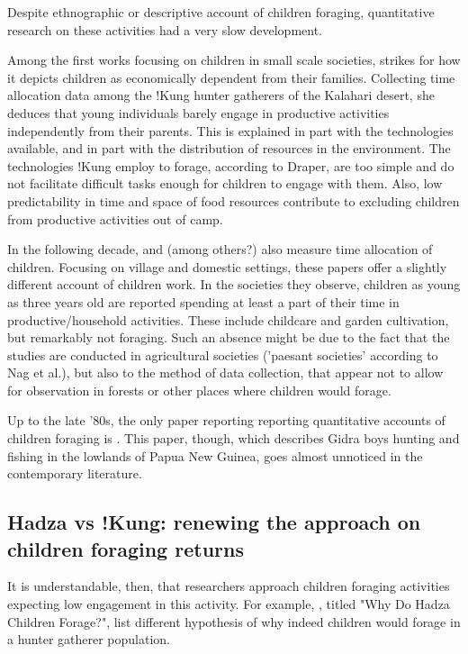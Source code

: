 Despite ethnographic or descriptive account of children foraging, quantitative research on these activities had a very slow development. %

Among the first works focusing on children in small scale societies, \cite{lee_social_1976} strikes for how it depicts children as economically dependent from their families. Collecting time allocation data among the !Kung hunter gatherers of the Kalahari desert, she deduces that young individuals barely engage in productive activities independently from their parents. This is explained in part with the technologies available, and in part with the distribution of resources in the environment. The technologies !Kung employ to forage, according to Draper, are too simple and do not facilitate difficult tasks enough for children to engage with them. Also, low predictability in time and space of food resources contribute to excluding children from productive activities out of camp. 

In the following decade, \cite{nag_anthropological_1978} and \cite{munroe_childrens_1984} (among others?) also measure time allocation of children. Focusing on village and domestic settings, these papers offer a slightly different account of children work. In the societies they observe, children as young as three years old are reported spending at least a part of their time in productive/household activities. These include childcare and garden cultivation, but remarkably not foraging. Such an absence might be due to the fact that the studies are conducted in agricultural societies ('paesant societies' according to Nag et al.), but also to the method of data collection, that appear not to allow for observation in forests or other places where children would forage.

Up to the late '80s, the only paper reporting reporting quantitative accounts of children foraging is \cite{kawabe_development_1983}. This paper, though, which describes Gidra boys hunting and fishing in the lowlands of Papua New Guinea, goes almost unnoticed in the contemporary literature. 

\subsection{Hadza vs !Kung: renewing the approach on children foraging returns}

It is understandable, then, that researchers approach children foraging activities expecting low engagement in this activity. For example, \cite{blurton_jones_why_1997}, titled "Why Do Hadza Children Forage?", list different hypothesis of why indeed children would forage in a hunter gatherer population. 

